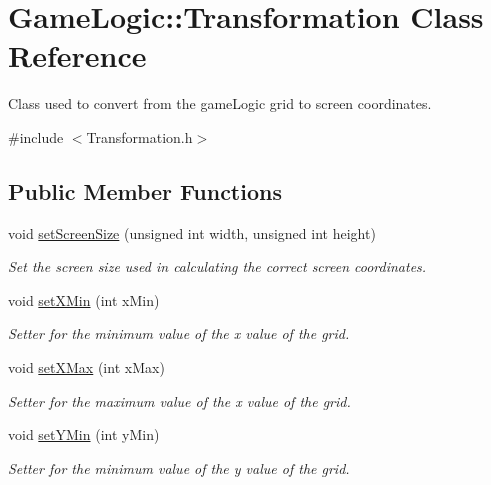 \hypertarget{classGameLogic_1_1Transformation}{}\section{Game\+Logic\+:\+:Transformation Class Reference}
\label{classGameLogic_1_1Transformation}


Class used to convert from the game\+Logic grid to screen coordinates.  




{\ttfamily \#include $<$Transformation.\+h$>$}

\subsection*{Public Member Functions}
\begin{DoxyCompactItemize}
\item 
void \hyperlink{classGameLogic_1_1Transformation_a1a65e0d2527c3c558f5dfe59e0832d52}{set\+Screen\+Size} (unsigned int width, unsigned int height)
\begin{DoxyCompactList}\small\item\em Set the screen size used in calculating the correct screen coordinates. \end{DoxyCompactList}\item 
void \hyperlink{classGameLogic_1_1Transformation_a69686d5a12ba0e04b6ea7b80e5c874ac}{set\+X\+Min} (int x\+Min)
\begin{DoxyCompactList}\small\item\em Setter for the minimum value of the x value of the grid. \end{DoxyCompactList}\item 
void \hyperlink{classGameLogic_1_1Transformation_ac1818769a0212075fb865d0495ced12c}{set\+X\+Max} (int x\+Max)
\begin{DoxyCompactList}\small\item\em Setter for the maximum value of the x value of the grid. \end{DoxyCompactList}\item 
void \hyperlink{classGameLogic_1_1Transformation_a8863f56cd8d117a6817d288fa28258bd}{set\+Y\+Min} (int y\+Min)
\begin{DoxyCompactList}\small\item\em Setter for the minimum value of the y value of the grid. \end{DoxyCompactList}\item 

\end{DoxyCompactItemize}
